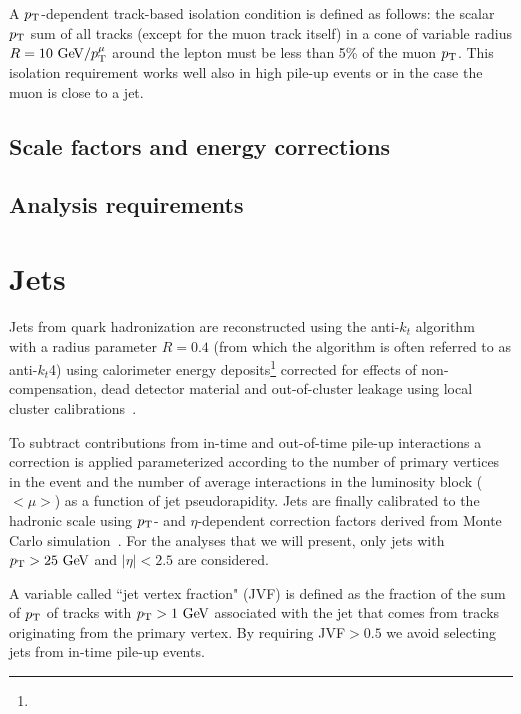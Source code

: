 A  $\pt$-dependent track-based isolation condition is defined as follows:
the scalar $\pt$ sum of all tracks (except for the muon track itself) 
in a cone of variable radius $R=10\gev/\pt^\mu$ around the lepton
must be less than 5\% of the muon $\pt$.
This isolation requirement works well also in high pile-up events
or in the case the muon is close to a jet.

\subsection{Scale factors and energy corrections}

\subsection{Analysis requirements}



\section{Jets}\label{sec:jets}

Jets from quark hadronization are reconstructed using the anti-$k_t$
algorithm~\cite{ref:Cacciari2008,ref:Cacciari2006,ref:fastjet} with a
radius parameter $R=0.4$ (from which the algorithm is often referred to as anti-$k_t$4) 
using calorimeter energy deposits\footnote{}
corrected for effects of non-compensation,
dead detector material and out-of-cluster leakage using local cluster calibrations~\cite{LCW1,LCW2}.

To subtract contributions from in-time and out-of-time pile-up interactions a correction is applied
parameterized according to the number of primary vertices in the event and the number of average interactions 
in the luminosity block ($<\mu>$) as a function of jet pseudorapidity.
Jets are finally calibrated to the hadronic scale using $\pt$- and $\eta$-dependent correction factors 
derived from Monte Carlo simulation~\cite{jes}.
For the analyses that we will present, only jets with $\pt > 25\gev$ and $|\eta| < 2.5$ are considered.

A variable called ``jet vertex fraction" (JVF) is defined as the fraction
of the sum of $\pt$ of tracks with $\pt>1\gev$
associated with the jet that comes from tracks originating from the primary vertex.
By requiring JVF$>0.5$ we avoid selecting jets from in-time pile-up events.

